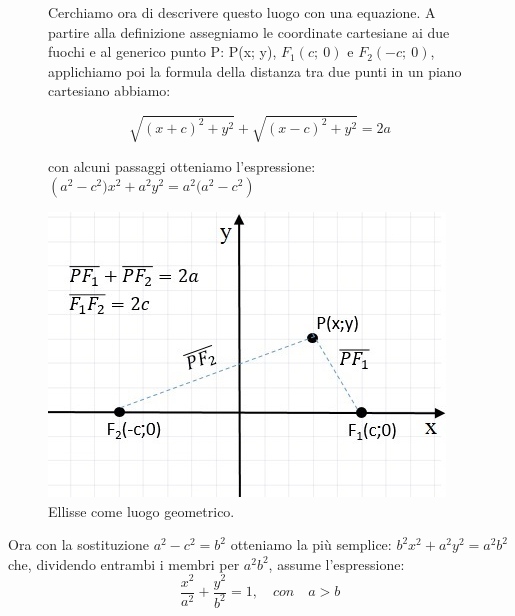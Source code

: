 \begin{figure}[h]
\noindent\begin{minipage}{.50\textwidth}
Cerchiamo ora di descrivere questo luogo con una equazione. A partire alla 
definizione assegniamo le coordinate cartesiane ai due fuochi e al generico 
punto P: P(x; y), $ F_{1}(c;~0)$ e $ F_{2} (-c;~0)$, applichiamo poi la 
formula della distanza tra due punti in un piano cartesiano abbiamo:

\[\sqrt{(x+c)^{2}+y^{2}}+\sqrt{(x-c)^{2}+y^{2}}=2a\] 

con alcuni passaggi otteniamo l'espressione:
$\left( a^{2}-c^{2})x^{2}+a^{2}y^{2}=a^{2}(a^{2}-c^{2}\right)$
\end{minipage}
\hfill
\begin{minipage}{.48\textwidth}
\begin{center}
  \includegraphics[width=.9\textwidth]{img/PF1F2.jpg}
  \caption{Ellisse come luogo geometrico.}
\end{center}
\end{minipage} 
\end{figure}

Ora con la sostituzione $a^{2}-c^{2}=b^{2}$ otteniamo la più semplice:  
$b^{2}x^{2}+a^{2}y^{2}=a^{2}b^{2}$ che, dividendo entrambi i membri per 
$a^{2}b^{2}$, assume l'espressione:
\begin{equation}
\label{CanonicaEllisse}
\dfrac{x^{2}}{a^{2}}+\dfrac{y^{2}}{b^{2}}=1, \quad con  \quad a>b
\end{equation}

